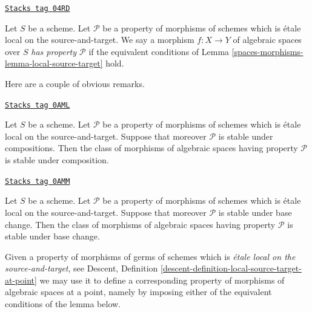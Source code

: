 \begin{definition}[P]
\label{spaces-morphisms-definition-P}
\href{https://stacks.math.columbia.edu/tag/04RD}{\texttt{Stacks tag 04RD}}

Let $S$ be a scheme.
Let $\mathcal{P}$ be a property of morphisms of schemes
which is \'etale local on the source-and-target.
We say a morphism $f : X \to Y$ of algebraic spaces over $S$
{\it has property $\mathcal{P}$} if the equivalent conditions of
Lemma \ref{spaces-morphisms-lemma-local-source-target}
hold.
\end{definition}

Here are a couple of obvious remarks.

\begin{remark}[Composition P]
\label{spaces-morphisms-remark-composition-P}
\href{https://stacks.math.columbia.edu/tag/0AML}{\texttt{Stacks tag 0AML}}

Let $S$ be a scheme. Let $\mathcal{P}$ be a property of morphisms of schemes
which is \'etale local on the source-and-target. Suppose that moreover
$\mathcal{P}$ is stable under compositions. Then the class of morphisms
of algebraic spaces having property $\mathcal{P}$ is stable under composition.
\end{remark}

\begin{remark}
\label{spaces-morphisms-remark-base-change-P}
\href{https://stacks.math.columbia.edu/tag/0AMM}{\texttt{Stacks tag 0AMM}}

Let $S$ be a scheme. Let $\mathcal{P}$ be a property of morphisms of schemes
which is \'etale local on the source-and-target. Suppose that moreover
$\mathcal{P}$ is stable under base change. Then the class of morphisms
of algebraic spaces having property $\mathcal{P}$ is stable under base change.
\end{remark}

Given a property of morphisms of germs of schemes which is {\it \'etale local
on the source-and-target}, see
Descent, Definition \ref{descent-definition-local-source-target-at-point}
we may use it to define a corresponding property of morphisms of
algebraic spaces at a point, namely by imposing either of
the equivalent conditions of the lemma below.

